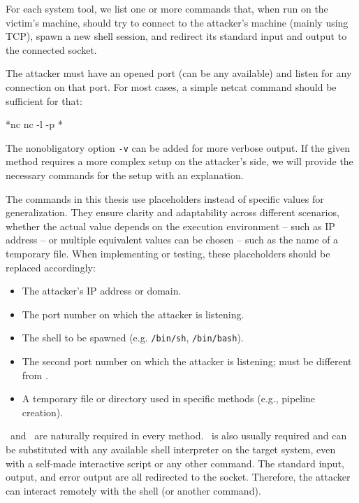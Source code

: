 For each system tool, we list one or more commands that, when run on the victim's machine, should try to connect to the attacker's machine (mainly using TCP), spawn a new shell session, and redirect its standard input and output to the connected socket.

The attacker must have an opened port (can be any available) and listen for any connection on that port. For most cases, a simple netcat command should be sufficient for that:

\begin{cmdline}{*}{nc}{}
nc -l -p *\port*
\end{cmdline}

The nonobligatory option \texttt{-v} can be added for more verbose output. If the given method requires a more complex setup on the attacker's side, we will provide the necessary commands for the setup with an explanation.

The commands in this thesis use placeholders instead of specific values for generalization. They ensure clarity and adaptability across different scenarios, whether the actual value depends on the execution environment -- such as IP address -- or multiple equivalent values can be chosen -- such as the name of a temporary file. When implementing or testing, these placeholders should be replaced accordingly:

\setlength{\leftmargini}{5em}
\begin{itemize}
\item[\host] The attacker's IP address or domain.
\item[\port] The port number on which the attacker is listening.
\item[\shell] The shell to be spawned (e.g. \texttt{/bin/sh}, \texttt{/bin/bash}).
\item[\portt] The second port number on which the attacker is listening; must be different from \port.
\item[\tmp] A temporary file or directory used in specific methods (e.g., pipeline creation).
\end{itemize}
\setlength{\leftmargini}{2.5em}

\host\ and \port\ are naturally required in every method. \shell\ is also usually required and can be substituted with any available shell interpreter on the target system, even with a self-made interactive script or any other command. The standard input, output, and error output are all redirected to the socket. Therefore, the attacker can interact remotely with the shell (or another command).

